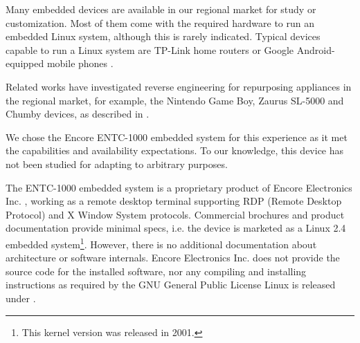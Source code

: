 \documentclass[conference]{IEEEtran}
\newcommand{\nota}[1]{}
\begin{document}
\nota{Existen decenas de dispositivos embebidos en el mercado regional,
que pueden adquirirse para su estudio y adaptación. Y,
aunque muchas veces no se encuentren visiblemente etiquetados o documentados,
gran parte de estos sistemas contienen el hardware necesario
para ejecutar un sistema operativo Linux embebido. Ejemplos de estos dispositivos
capaces de ejecutar un sistema Linux son los routers hogareños TP-Link,
y los teléfonos móviles con sistema Google Android \cite{android}.
}
Many embedded devices are available in our regional market for study or customization. Most of them come with the required hardware to run an embedded Linux system, although this is rarely indicated.
Typical devices capable to run a Linux system are TP-Link home routers or Google Android-equipped mobile phones \cite{android, tplink}.

Related works have investigated
reverse engineering for repurposing appliances in the regional market,
for example, the Nintendo Game Boy, Zaurus SL-5000 and Chumby devices,
as described in \cite{camargo1, camargo2, castillo1}.

We chose the Encore ENTC-1000 embedded system for this experience
as it met the capabilities and availability expectations. To our
knowledge, this device has not been studied for adapting to
arbitrary purposes.





\nota{
El sistema embebido ENTC-1000 es un producto propietario de Encore Electronics Inc \cite{encore},
que funciona como una terminal de escritorio remoto, soportando
los protocolos RDP (Remote-Desktop-Protocol) y Xwindow. Si bien el folleto
comercial y su documentación proveen especificaciones mínimas,
esto es, se publicita como un sistema con Linux embebido kernel 2.4
\footnote{Año 2001}, no existe información adicional de la arquitectura o funcionamiento
interno del software. Tampoco provee, Encore Electronic Inc.,
el código fuente del software instalado, ni las instrucciones
para su compilación e instalación (como es requerido por la licencia GPL de Linux \cite{gpl}).
}

The ENTC-1000 embedded system is a proprietary product of Encore Electronics Inc. \cite{encore},
working as a remote desktop terminal supporting RDP (Remote Desktop Protocol) and X Window System protocols. Commercial brochures and product documentation provide minimal specs, i.e. the device is marketed as a Linux 2.4 embedded system\footnote{This kernel version was released in 2001.}. However, there is no additional documentation about architecture or software internals. Encore Electronics Inc. does not provide the source code for the installed software, nor any compiling and installing instructions as required by the
GNU General Public License Linux is released under \cite{gpl}.
\end{document}
